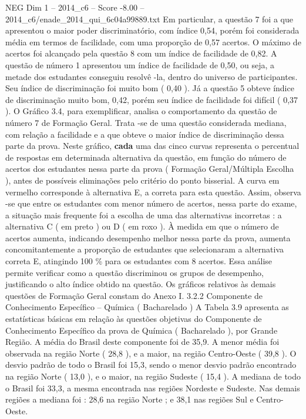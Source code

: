 \begin{textsample}{NEG Dim 1 – 2014\_c6 – Score -8.00 – 2014\_c6/enade\_2014\_qui\_6c04a99889.txt}
Em particular, a questão 7 foi a que apresentou o maior poder discriminatório, com índice 0,54, porém foi considerada média em termos de facilidade, com uma proporção de 0,57 acertos.
O máximo de acertos foi alcançado pela questão 8 com um índice de facilidade de 0,82.
A questão de número 1 apresentou um índice de facilidade de 0,50, ou seja, a metade dos estudantes conseguiu resolvê -la, dentro do universo de participantes.
Seu índice de discriminação foi muito bom ( 0,40 ).
Já a questão 5 obteve índice de discriminação muito bom, 0,42, porém seu índice de facilidade foi difícil ( 0,37 ).
O Gráfico 3.4, para exemplificar, analisa o comportamento da questão de número 7 de Formação Geral.
Trata -se de uma questão considerada mediana, com relação a facilidade e a que obteve o maior índice de discriminação dessa parte da prova.
Neste gráfico, \textbf{cada} uma das cinco curvas representa o percentual de respostas em determinada alternativa da questão, em função do número de acertos dos estudantes nessa parte da prova ( Formação Geral/Múltipla Escolha ), antes de possíveis eliminações pelo critério do ponto bisserial.
A curva em vermelho corresponde à alternativa E, a correta para esta questão.
Assim, observa -se que entre os estudantes com menor número de acertos, nessa parte do exame, a situação mais frequente foi a escolha de uma das alternativas incorretas : a alternativa C ( em preto ) ou D ( em roxo ).
À medida em que o número de acertos aumenta, indicando desempenho melhor nessa parte da prova, aumenta concomitantemente a proporção de estudantes que selecionaram a alternativa correta E, atingindo 100 \% para os estudantes com 8 acertos.
Essa análise permite verificar como a questão discriminou os grupos de desempenho, justificando o alto índice obtido na questão.
Os gráficos relativos às demais questões de Formação Geral constam do Anexo I. 3.2.2 Componente de Conhecimento Específico – Química ( Bacharelado ) A Tabela 3.9 apresenta as estatísticas básicas em relação às questões objetivas do Componente de Conhecimento Específico da prova de Química ( Bacharelado ), por Grande Região.
A média do Brasil deste componente foi de 35,9.
A menor média foi observada na região Norte ( 28,8 ), e a maior, na região Centro-Oeste ( 39,8 ).
O desvio padrão de todo o Brasil foi 15,3, sendo o menor desvio padrão encontrado na região Norte ( 13,0 ), e o maior, na região Sudeste ( 15,4 ).
A mediana de todo o Brasil foi 33,3, a mesma encontrada nas regiões Nordeste e Sudeste.
Nas demais regiões a mediana foi : 28,6 na região Norte ; e 38,1 nas regiões Sul e Centro-Oeste.

\end{textsample}
